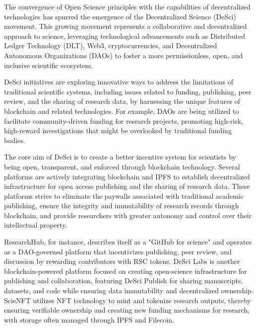 The convergence of Open Science principles with the capabilities of decentralized technologies has spurred the emergence of the Decentralized Science (DeSci) movement. This growing movement represents a collaborative and decentralized approach to science, leveraging technological advancements such as Distributed Ledger Technology (DLT), Web3, cryptocurrencies, and Decentralized Autonomous Organizations (DAOs) to foster a more permissionless, open, and inclusive scientific ecosystem.

DeSci initiatives are exploring innovative ways to address the limitations of traditional scientific systems, including issues related to funding, publishing, peer review, and the sharing of research data, by harnessing the unique features of blockchain and related technologies. For example, DAOs are being utilized to facilitate community-driven funding for research projects, promoting high-risk, high-reward investigations that might be overlooked by traditional funding bodies.

The core aim of DeSci is to create a better incentive system for scientists by being open, transparent, and enforced through blockchain technology. Several platforms are actively integrating blockchain and IPFS to establish decentralized infrastructure for open access publishing and the sharing of research data. These platforms strive to eliminate the paywalls associated with traditional academic publishing, ensure the integrity and immutability of research records through blockchain, and provide researchers with greater autonomy and control over their intellectual property.

ResearchHub, for instance, describes itself as a "GitHub for science" and operates as a DAO-governed platform that incentivizes publishing, peer review, and discussion by rewarding contributors with RSC tokens. DeSci Labs is another blockchain-powered platform focused on creating open-science infrastructure for publishing and collaboration, featuring DeSci Publish for sharing manuscripts, datasets, and code while ensuring data immutability and decentralized ownership. ScieNFT utilizes NFT technology to mint and tokenize research outputs, thereby ensuring verifiable ownership and creating new funding mechanisms for research, with storage often managed through IPFS and Filecoin.

